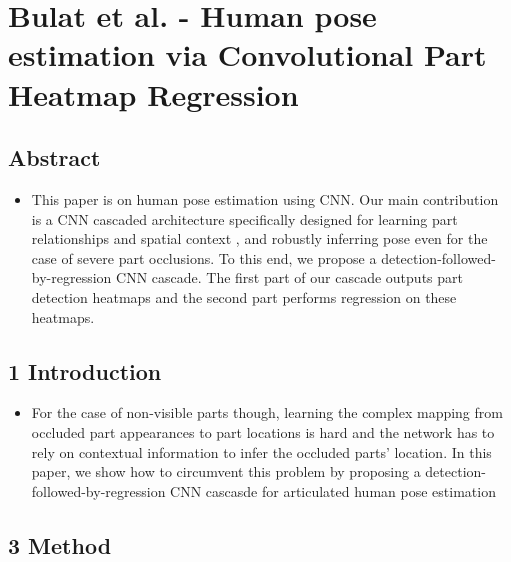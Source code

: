 \documentclass{report}
\begin{document}
\section*{Bulat et al. - Human pose estimation via Convolutional Part Heatmap Regression}
\subsection*{Abstract}
\begin{itemize}
    \item This paper is on human pose estimation using CNN. Our main contribution is a CNN cascaded architecture specifically designed for learning part relationships and spatial context , and robustly inferring pose even for the case of severe part occlusions. To this end, we propose a detection-followed-by-regression CNN cascade. The first part of our cascade outputs part detection heatmaps and the second part performs regression on these heatmaps.
\end{itemize}
\subsection*{1 Introduction}
\begin{itemize}
    \item For the case of non-visible parts though, learning the complex mapping from occluded part appearances to part locations is hard and the network has to rely on contextual information to infer the occluded parts' location. In this paper, we show how to circumvent this problem by proposing a detection-followed-by-regression CNN cascasde for articulated human pose estimation
\end{itemize}
\subsection*{3 Method}
\end{document}
